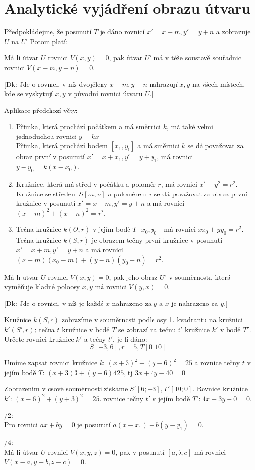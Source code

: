
\BeginDoc{}
\section{ Analytické vyjádření obrazu útvaru}
\V Předpokládejme, že posunutí $T$ je dáno rovnicí $x' = x+m, y'=y+n$ a zobrazuje $U$ na $U'$ Potom platí:

Má li útvar $U$ rovnici $V(x,y)=0$, pak útvar $U'$ má v téže soustavě souřadnic
rovnici $V(x-m,y-n) = 0$.

[Dk: Jde o rovnici, v níž dvojčleny $x-m,y-n$ nahrazují $x,y$ na všech místech, kde se vyskytují $x,y$ v původní rovnici útvaru $U$.]

\Poz
Aplikace předchozí věty:
\begin{enumerate}
	\item Přímka, která prochází počátkem a má směrnici $k$, má také velmi jednoduchou rovnici $y=kx$\\
		Přímka, která prochází bodem $[x_1,y_1]$ a má směrnici $k$ se dá považovat za obraz první v posunutí $x'=x+x_1, y'=y+y_1$, má rovnici  $y-y_0 = k(x-x_0)$.
	\item Kružnice, která má střed v počátku a poloměr $r$, má rovnici $x^2 + y^2 = r^2$.\\
		Kružnice se středem $S[m,n]$ a poloměrem $r$ se dá považovat za obraz první kružnice v posunutí
		$x'=x+m,y' = y+n$ a má rovnici $(x-m)^2 + (x-n)^2 = r^2$.

	\item Tečna kružnice $k(O,r)$ v jejím bodě $T[x_0,y_0]$ má rovnici $xx_0+yy_0 = r^2$.
		Tečna kružnice $k(S,r)$ je obrazem tečny první kružnice v posunutí $x'=x+m,y'=y+n$ a má rovnici
		$(x-m)(x_0-m) + (y-n)(y_0-n) = r^2$.
\end{enumerate}

\V
Má li útvar $U$ rovnici $V(x,y)=0$, pak jeho obraz $U'$ v souměrnosti, která vyměňuje kladné poloosy $x,y$ má rovnici $V(y,x) = 0$.

[Dk: Jde o rovnici, v níž je každé $x$ nahrazeno za $y$ a $x$ je nahrazeno za $y$.]

\Pr
Kružnice $k(S,r)$ zobrazíme v souměrnosti podle osy 1. kvadrantu na kružnici $k'(S',r)$;
tečna $t$ kružnice v bodě $T$ se zobrazí na tečnu $t'$ kružnice $k'$ v bodě $T'$.
Určete rovnici kružnice $k'$ a tečny $t'$, je-li dáno:
$$ S[-3,6], r = 5, T[0;10]$$

Umíme zapsat rovnici kružnice $k$: $(x+3)^2 + (y-6)^2 = 25$ a rovnice tečny $t$ v jejím bodě $T$:
$(x+3)3 + (y-6) 4  25$, tj $3x+4y-40=0$

Zobrazením v osové souměrnosti získáme $S'[6;-3],T'[10;0]$.
Rovnice kružnice $k'$: $(x-6)^2 + (y+3)^2 = 25$.
rovnice tečny $t'$ v jejím bodě $T'$: $4x+3y - 0 =0$.

/2:\\
Pro rovnici $ax+by = 0$ je posunutí $a(x-x_1)+b(y-y_1) = 0$.

/4:\\
Má li útvar $U$ rovnici $V(x,y,z)=0$, pak v posunutí $[a,b,c]$ má rovnici $V(x-a,y-b,z-c) = 0$.


\EndDoc

